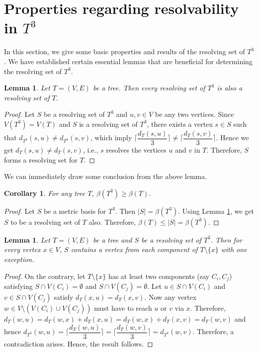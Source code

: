 \documentclass{article}
\newtheorem{cor}[thm]{Corollary}
\newtheorem{lem}[thm]{Lemma}
\theoremstyle{definition}
\numberwithin{equation}{section}
\begin{document}
\section{Properties regarding resolvability in $T^{3}$}
In this section, we give some basic properties and results of the resolving set of $T^{3}$. We have established certain essential lemmas that are beneficial for determining the resolving set of $T^{3}$. 



\begin{lem}\label{1}
Let $T=(V,E)$ be a tree. Then every resolving set of $T^{3}$ is also a resolving set of $T$.  
\end{lem}

\begin{proof}
Let $S$ be a resolving set of $T^{3}$ and $u,v\in V$ be any two vertices. Since $V(T^{3})=V(T)$ and $S$ is a resolving set of $T^{3}$, there exists a vertex $s\in S$ such that $d_{T^{3}}(s,u)\neq d_{T^{3}}(s,v)$, which imply $\lceil \dfrac{d_{T}(s,u)}{3} \rceil \neq \lceil\dfrac{d_{T}(s,v)}{3} \rceil$. 
Hence we get $d_{T}(s,u)\neq d_{T}(s,v)$, i.e., $s$ resolves the vertices $u$ and $v$ in $T$. Therefore, $S$ forms a resolving set for $T$.
\end{proof}

\noindent We can immediately draw some conclusion from the above lemma.
\begin{cor}\label{1.5}
For any tree $T$, $\beta{(T^{3})}\geq \beta{(T)}$. 
\end{cor}

\begin{proof}
Let $S$ be a metric basis for $T^{3}$. Then $|S|=\beta{(T^{3})}$. Using Lemma \ref{1}, we get $S$ to be a resolving set of $T$ also. Therefore, $\beta{(T)}\leq |S|=\beta{(T^{3})}$.
\end{proof}

\begin{lem}\label{2}
Let $T=(V,E)$ be a tree and $S$ be a resolving set of $T^{3}$. Then for every vertex $x\in V$, $S$ contains a vertex from each component of $T\setminus \{x\}$ with one exception.
\end{lem}

\begin{proof}
On the contrary, let $T\setminus \{x\}$ has at least two components (say $C_{i},C_{j}$) satisfying $S\cap V(C_{i})=\emptyset$ and $S\cap V(C_{j})=\emptyset$. Let $u\in S\cap V(C_{i})$ and $v\in S\cap V(C_{j})$ satisfy $d_{T}(x,u)=d_{T}(x,v)$. Now any vertex $w\in V\setminus (V(C_{i})\cup V(C_{j}))$ must have to reach $u$ or $v$ via $x$. Therefore, $d_{T}(w,u)=d_{T}(w,x)+d_{T}(x,u)=d_{T}(w,x)+d_{T}(x,v)=d_{T}(w,v)$ and hence $d_{T^{3}}(w,u)=\lceil \dfrac{d_{T}(w,u)}{3}\rceil=\lceil \dfrac{d_{T}(w,v)}{3}\rceil=d_{T^{3}}(w,v)$. Therefore, a contradiction arises. Hence, the result follows.
\end{proof}
\end{document}
